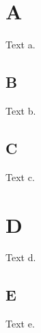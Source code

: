 \documentclass{article}
\begin{document}
\section{A}\label{sec}
Text a.
\subsection{B}
Text b.
\subsection{C}\label{sec:c}
Text c.
\section{D}
Text d.
\subsection{E}
Text e.
\end{document}
